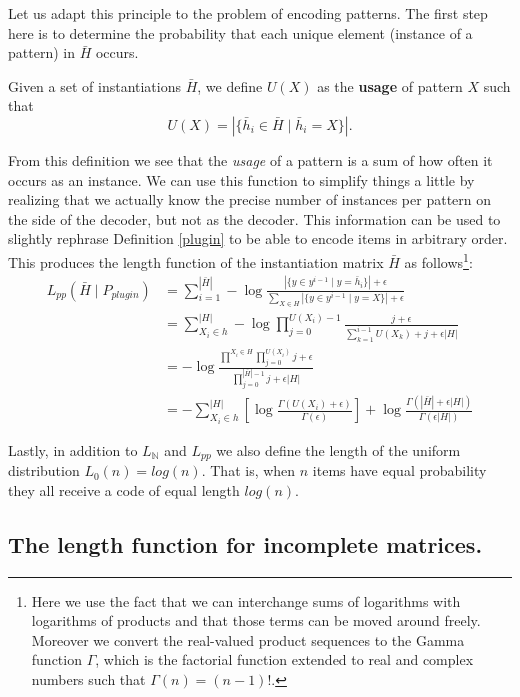 \documentclass[a4paper,notoc,oneside]{tufte-book}
\begin{document}
Let us adapt this principle to the problem of encoding patterns. The first step here is to determine the probability that each unique element (instance of a pattern) in $\bar{H}$ occurs. 

\begin{definition}\label{usage}
Given a set of instantiations $\bar{H}$, we define $U(X)$ as the \textbf{usage} of pattern $X$ such that
$$
	U(X) = |\{ \bar{h}_i \in \bar{H} \mid \bar{h}_i = X\}|.
$$
\end{definition}

From this definition we see that the \emph{usage} of a pattern is a sum of how often it occurs as an instance. We can use this function to simplify things a little by realizing that we actually know the precise number of instances per pattern on the side of the decoder, but not as the decoder. This information can be used to slightly rephrase Definition \ref{plugin} to be able to encode items in arbitrary order. This produces the length function of the instantiation matrix $\bar{H}$ as follows\footnote{Here we use the fact that we can interchange sums of logarithms with logarithms of products and that those terms can be moved around freely. Moreover we convert the real-valued product sequences to the Gamma function $\Gamma$, which is the factorial function extended to real and complex numbers such that $\Gamma(n) = (n-1)!$.}:
\begin{align*}
	L_{pp}(\bar{H}\mid P_{plugin}) &= \sum^{|\bar{H}|}_{i=1} -\log \frac{|\{y \in y^{i-1} \mid y = \bar{h}_i\}| + \epsilon }{\sum_{X \in H}|\{y \in y^{i-1} \mid y = X\}| + \epsilon}\\
	&= \sum^{|H|}_{X_i \in h} -\log \prod^{U(X_i)-1}_{j=0} \frac{j+\epsilon}{\sum^{i-1}_{k=1} U(X_k)+j+\epsilon|H|} \\
	&= -\log \frac{\prod^{X_i\in H} \prod^{U(X_i)}_{j=0} j + \epsilon}{\prod^{|\bar{H}|-1}_{j=0} j + \epsilon|H|} \\
	&= -\sum^{|H|}_{X_i \in h} \left[ \log \frac{\Gamma(U(X_i)+\epsilon)}{\Gamma(\epsilon)}\right] + \log \frac{\Gamma(|\bar{H}| + \epsilon|H|)}{\Gamma(\epsilon|H|)}
\end{align*}

Lastly, in addition to $L_{\mathbb{N}}$ and $L_{pp}$ we also define the length of the uniform distribution $L_0(n)=log(n)$. That is, when $n$ items have equal probability they all receive a code of equal length $log(n)$.

\subsection{The length function for incomplete matrices.}
\end{document}

